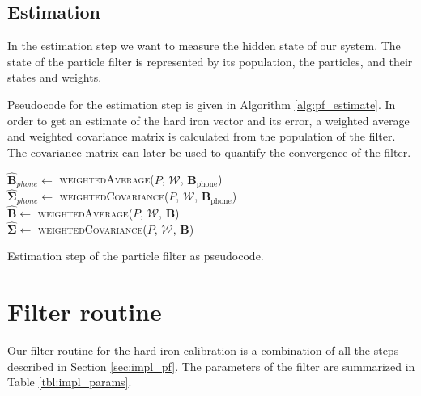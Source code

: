 \subsection{Estimation}

In the estimation step we want to measure the hidden state of our system. The state of the particle filter is represented by its population, the particles, and their states and weights.

Pseudocode for the estimation step is given in Algorithm \ref{alg:pf_estimate}. In order to get an estimate of the hard iron vector and its error, a weighted average and weighted covariance matrix is calculated from the population of the filter. The covariance matrix can later be used to quantify the convergence of the filter.

\begin{algorithm}[h]
    $\bm{\hat{B}}_{phone} \leftarrow$ \textsc{weightedAverage}($P$, $\mathcal{W}$, $\bm{B}_\text{phone}$)\\
    $\bm{\hat{\Sigma}}_{phone} \leftarrow$ \textsc{weightedCovariance}($P$, $\mathcal{W}$, $\bm{B}_\text{phone}$)\\
    $\bm{\hat{B}} \leftarrow$ \textsc{weightedAverage}($P$, $\mathcal{W}$, $\bm{B}$)\\
    $\bm{\hat{\Sigma}} \leftarrow$ \textsc{weightedCovariance}($P$, $\mathcal{W}$, $\bm{B}$)\\
	\caption{Estimation step of the particle filter as pseudocode.}
	\label{alg:pf_estimate}
\end{algorithm}

\section{Filter routine}

Our filter routine for the hard iron calibration is a combination of all the steps described in Section \ref{sec:impl_pf}. The parameters of the filter are summarized in Table \ref{tbl:impl_params}.


